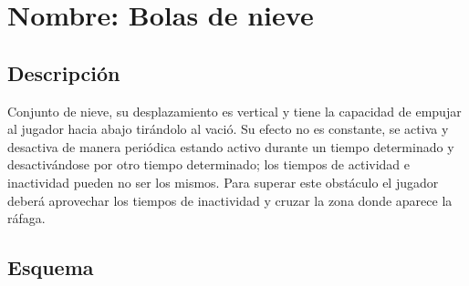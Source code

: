 		\section{Nombre: Bolas de nieve}\label{obs.bolasN}
	\subsection{Descripción}
	Conjunto de nieve, su desplazamiento es vertical y tiene la capacidad de empujar al jugador hacia abajo tirándolo al vació. Su efecto no es constante, se activa y desactiva de manera periódica estando activo durante un tiempo determinado y desactivándose por otro tiempo determinado; los tiempos de actividad e inactividad pueden no ser los mismos. Para superar este obstáculo el jugador deberá aprovechar los tiempos de inactividad y cruzar la zona donde aparece la ráfaga.
	\subsection{Esquema}
